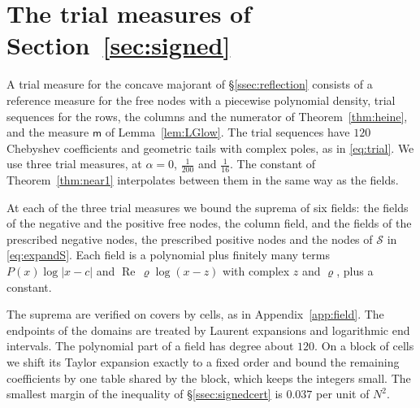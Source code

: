 \documentclass[11pt]{amsart}
\theoremstyle{definition}
\theoremstyle{remark}
\numberwithin{equation}{section}
\begin{document}
\section{The trial measures of Section~\ref{sec:signed}}\label{app:trials}

A trial measure for the concave majorant of \S\ref{ssec:reflection} consists of a reference measure for the
free nodes with a piecewise polynomial density, trial sequences for the rows, the columns and the numerator
of Theorem~\ref{thm:heine}, and the measure $\mathsf m$ of Lemma~\ref{lem:LGlow}. The trial sequences have $120$
Chebyshev coefficients and geometric tails with complex poles, as in \eqref{eq:trial}. We use three trial
measures, at $\alpha=0$, $\frac1{200}$ and $\frac1{16}$. The constant of Theorem~\ref{thm:near1} interpolates
between them in the same way as the fields.

At each of the three trial measures we bound the suprema of six fields: the fields of the negative and the
positive free nodes, the column field, and the fields of the prescribed negative nodes, the prescribed
positive nodes and the nodes of $\mathcal S$ in \eqref{eq:expandS}. Each field is a polynomial plus finitely many
terms $P(x)\log|x-c|$ and $\operatorname{Re}\,\varrho\log(x-z)$ with complex $z$ and $\varrho$, plus a constant.

The suprema are verified on covers by cells, as in Appendix~\ref{app:field}. The endpoints of the domains are
treated by Laurent expansions and logarithmic end intervals. The polynomial part of a field has degree about
$120$. On a block of cells we shift its Taylor expansion exactly to a fixed order and bound the remaining
coefficients by one table shared by the block, which keeps the integers small. The smallest margin of the
inequality of \S\ref{ssec:signedcert} is $0.037$ per unit of $N^2$.
\end{document}
